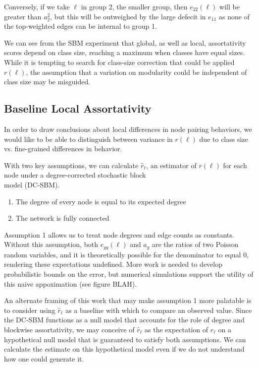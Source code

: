 \documentclass[12pt]{article}
\begin{document}
Conversely, if we take $\ell$ in group 2, the smaller group, then $e_{22}(\ell)$ will be greater than $a_2^2$, but this will be outweighed by the large defecit in $e_{11}$ as none of the top-weighted edges can be internal to group 1.

We can see from the SBM experiment that global, as well as local, assortativity scores depend on class size, reaching a maximum when classes have equal sizes.  While it is tempting to search for class-size correction that could be applied $r(\ell)$, the assumption that a variation on modularity could be independent of class size may be misguided.

\subsection{Baseline Local Assortativity}

In order to draw conclusions about local differences in node pairing behaviors, we would like to be able to distinguish between variance in $r(\ell)$ due to class size vs. fine-grained differences in behavior.  

With two key assumptions, we can calculate $\hat{r}_\ell$, an estimator of $r(\ell)$ for each node under a degree-corrected stochastic block \\model (DC-SBM).

\begin{enumerate}
  \item The degree of every node is equal to its expected degree
  \item The network is fully connected
\end{enumerate}

Assumption 1 allows us to treat node degrees and edge counts as constants.  Without this assumption, both $e_{gg}(\ell)$ and $a_g$ are the ratios of two Poisson random variables, and it is theoretically possible for the denominator to equal 0, rendering these expectations undefined.  More work is needed to develop probabilistic bounds on the error, but numerical simulations support the utility of this naive appoximation (see figure BLAH).

An alternate framing of this work that may make assumption 1 more palatable is to consider using $\hat{r}_\ell$ as a baseline with which to compare an observed value.  Since the DC-SBM functions as a null model that accounts for the role of degree and blockwise assortativity, we may conceive of $\hat{r}_\ell$ as the expectation of $r_\ell$ on a hypothetical null model that is guaranteed to satisfy both assumptions.  We can calculate the estimate on this hypothetical model even if we do not understand how one could generate it.
\end{document}
